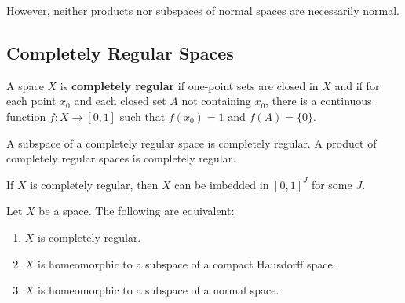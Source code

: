   However, neither products nor subspaces of normal spaces are necessarily normal. 

\subsection{Completely Regular Spaces}

  \begin{definition}
    A space $X$ is \textbf{completely regular} if one-point sets are closed in $X$ and if for each point $x_0$ and each closed set $A$ not containing $x_0$, there is a continuous function $f: X \longrightarrow [0,1]$ such that $f(x_0) = 1$ and $f(A) = \{0\}$. 
  \end{definition}

  \begin{theorem}
    A subspace of a completely regular space is completely regular. A product of completely regular spaces is completely regular. 
  \end{theorem}

  \begin{theorem}
    If $X$ is completely regular, then $X$ can be imbedded in $[0,1]^J$ for some $J$. 
  \end{theorem}

  \begin{corollary}
    Let $X$ be a space. The following are equivalent: 
    \begin{enumerate}
      \item $X$ is completely regular. 
      \item $X$ is homeomorphic to a subspace of a compact Hausdorff space. 
      \item $X$ is homeomorphic to a subspace of a normal space. 
    \end{enumerate}
  \end{corollary}


